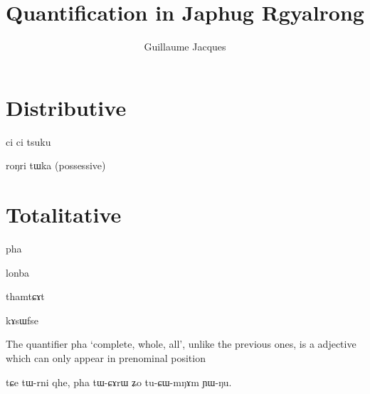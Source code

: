 \documentclass[oldfontcommands,oneside,a4paper,11pt]{article}
\newcommand{\ipa}[1]{{\phon #1}} %
\begin{document}
 

\title{Quantification in Japhug Rgyalrong}
\author{Guillaume Jacques}
\maketitle
\linenumbers
 
 
 \section{Distributive}
ci ci
tsuku


roŋri  tɯka (possessive) 
 
 
  \section{Totalitative}
 \ipa{pha}
 
 \ipa{lonba}
 
 \ipa{thamtɕɤt}
 
 \ipa{kɤsɯfse}
 
 
The quantifier \ipa{pha} `complete, whole, all', unlike the previous ones, is a   adjective  which can only appear in prenominal position 

tɕe tɯ-rni qhe, pha tɯ-ɕɤrɯ ʑo tu-ɕɯ-mŋɤm ɲɯ-ŋu.




\end{document}
